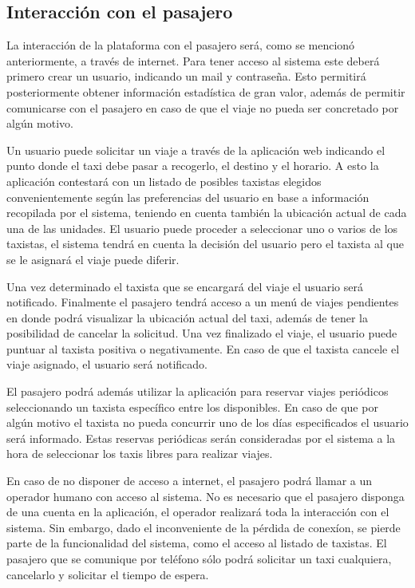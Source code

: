 \subsection{Interacción con el pasajero}
La interacción de la plataforma con el pasajero será, como se mencionó anteriormente, a través de internet. Para tener acceso al sistema este deberá primero crear un usuario, indicando un mail y contraseña. Esto permitirá posteriormente obtener información estad\'istica de gran valor, además de permitir comunicarse con el pasajero en caso de que el viaje no pueda ser concretado por algún motivo. 

Un usuario puede solicitar un viaje a través de la aplicación web indicando el punto donde el taxi debe pasar a recogerlo, el destino y el horario. A esto la aplicación contestará con un listado de posibles taxistas elegidos convenientemente según las preferencias del usuario en base a información recopilada por el sistema, teniendo en cuenta también la ubicación actual de cada una de las unidades. El usuario puede proceder a seleccionar uno o varios de los taxistas, el sistema tendrá en cuenta la decisión del usuario pero el taxista al que se le asignará el viaje puede diferir.

Una vez determinado el taxista que se encargará del viaje el usuario será notificado. Finalmente el pasajero tendrá acceso a un menú de viajes pendientes en donde podrá visualizar la ubicación actual del taxi, además de tener la posibilidad de cancelar la solicitud. Una vez finalizado el viaje, el usuario puede puntuar al taxista positiva o negativamente. En caso de que el taxista cancele el viaje asignado, el usuario será notificado.

El pasajero podrá además utilizar la aplicación para reservar viajes periódicos seleccionando un taxista espec\'ifico entre los disponibles. En caso de que por algún motivo el taxista no pueda concurrir uno de los d\'ias especificados el usuario será informado. Estas reservas periódicas serán consideradas por el sistema a la hora de seleccionar los taxis libres para realizar viajes.

En caso de no disponer de acceso a internet, el pasajero podrá llamar a un operador humano con acceso al sistema. No es necesario que el pasajero disponga de una cuenta en la aplicación, el operador realizará toda la interacción con el sistema. Sin embargo, dado el inconveniente de la p\'erdida de conex\'ion, se pierde parte de la funcionalidad del sistema, como el acceso al listado de taxistas. El pasajero que se comunique por tel\'efono s\'olo podr\'a solicitar un taxi cualquiera, cancelarlo y solicitar el tiempo de espera.

